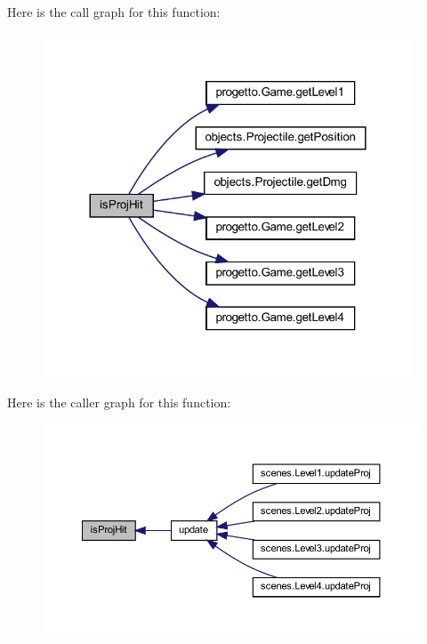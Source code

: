 Here is the call graph for this function\+:\nopagebreak
\begin{figure}[H]
\begin{center}
\leavevmode
\includegraphics[width=312pt]{classmanagers_1_1_projectile_manager_a90bf53002c3a067a25aba3e876974051_cgraph}
\end{center}
\end{figure}
Here is the caller graph for this function\+:\nopagebreak
\begin{figure}[H]
\begin{center}
\leavevmode
\includegraphics[width=350pt]{classmanagers_1_1_projectile_manager_a90bf53002c3a067a25aba3e876974051_icgraph}
\end{center}
\end{figure}
\mbox{\label{classmanagers_1_1_projectile_manager_ad4505ed80d64e9561393c0406fe7d904}} 
